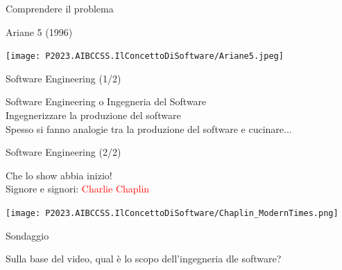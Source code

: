 \documentclass{beamer}
\begin{document}
\begin{frame}{\centerline{Comprendere il problema}}

\begin{center}
{\Large
Ariane 5 (1996)\\
}
\end{center}
\begin{center}
\texttt{[image: P2023.AIBCCSS.IlConcettoDiSoftware/Ariane5.jpeg]}
\end{center}

\end{frame}



\begin{frame}{\centerline{Software Engineering (1/2)}}

\begin{center}
Software Engineering o Ingegneria del Software\\
\vspace{1cm}
{\Large
Ingegnerizzare la produzione del software\\
}
\vspace{2cm}
Spesso si fanno analogie tra la produzione del software e cucinare...
\end{center}
\end{frame}

\begin{frame}{\centerline{Software Engineering (2/2)}}

\begin{center}
\Large
Che lo show abbia inizio!\\
\vspace*{0.5cm}
Signore e signori: \textcolor{red}{Charlie Chaplin}
\end{center}
\begin{center}
\texttt{[image: P2023.AIBCCSS.IlConcettoDiSoftware/Chaplin\_ModernTimes.png]}
\end{center}

\end{frame}



\begin{frame}{\centerline{Sondaggio}}
\begin{center}
Sulla base del video, qual \`{e} lo scopo dell'ingegneria dle software?
\end{center}
\end{frame}
\end{document}
